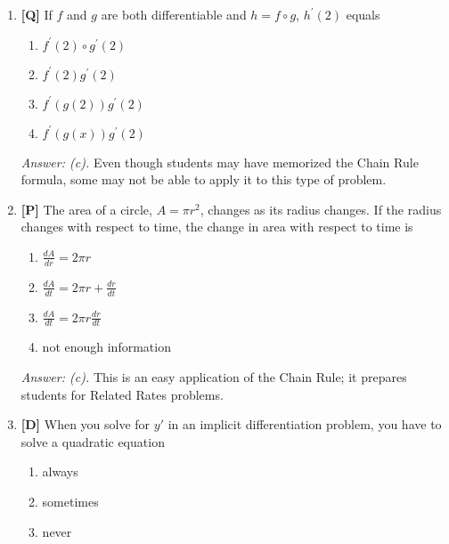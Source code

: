 \documentclass[12pt]{article}
\begin{document}
\begin{enumerate}
\begin{enumerate}
\item chain rule
\item product rule
\item quotient Rule
\item addition rule
\end{enumerate}

{\it Answer: (a).} Straight forward application of chain rule if they
have seen this type of problem before.

\bigskip

\item {\bf [Q]} If $f$ and $g$ are both differentiable and $h=f\circ g$, $h^{\prime}(2)$ equals
\begin {enumerate}
\item $f^{\prime}(2)\circ g^{\prime}(2)$
\item $f^{\prime}(2)g^{\prime}(2)$
\item $f^{\prime}(g(2)) g^{\prime}(2)$
\item $f^{\prime}(g(x)) g^{\prime}(2)$
\end{enumerate}

{\it Answer: (c).} Even though students may have memorized the Chain Rule formula, some may not be able to apply it to this type of problem.

\bigskip

\item {\bf [P]} The area of a circle, $A=\pi r^2$, changes as its radius changes. If the radius 
changes with respect to time, the change in area with respect to time is
\begin {enumerate}
\item $\displaystyle{ \frac{dA}{dr}=2\pi r}$
\item $\displaystyle{ \frac{dA}{dt}=2\pi r+\frac{dr}{dt}}$
\item $\displaystyle{ \frac{dA}{dt}=2\pi r \frac{dr}{dt}}$
\item not enough information
\end{enumerate}

{\it Answer: (c).} This is an easy application of the Chain Rule; it prepares students for Related Rates problems.

\bigskip

\item {\bf [D]} When you solve for $y'$ in an implicit differentiation problem, you have to solve a quadratic equation
\begin {enumerate}
\item always
\item sometimes
\item never
\end {enumerate}


\end{enumerate}
\end{document}

